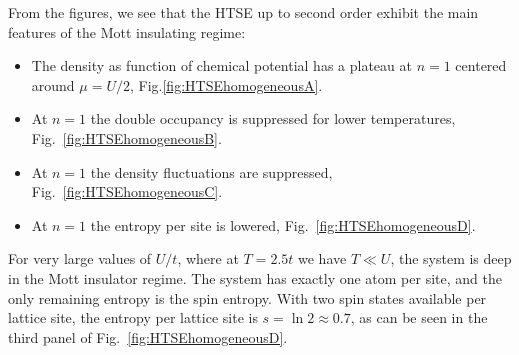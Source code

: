 From the figures, we see that the HTSE up to second order exhibit the main
features of the Mott insulating regime: 
\begin{itemize}
\item The density as function of chemical potential has a
plateau at $n=1$ centered around $\mu=U/2$, Fig.\ref{fig:HTSEhomogeneousA}.
\item At $n=1$ the double occupancy
is suppressed for lower temperatures, Fig.~\ref{fig:HTSEhomogeneousB}.
\item
At $n=1$ the density fluctuations are suppressed, Fig.~\ref{fig:HTSEhomogeneousC}.
\item At $n=1$ the entropy per site is lowered,
Fig.~\ref{fig:HTSEhomogeneousD}.
\end{itemize}
For very large values of $U/t$, where at $T=2.5t$ we have $T \ll U$, the system
is deep in the Mott insulator regime.  The system has exactly one atom per
site, and the only remaining entropy is the spin entropy.  With two spin states
available per lattice site, the entropy per lattice site is $s = \ln 2 \approx
0.7 $, as can be seen in the third panel of Fig.~\ref{fig:HTSEhomogeneousD}.  

